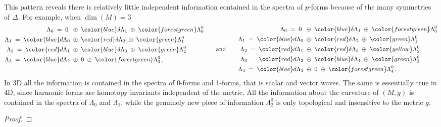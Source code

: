 \begin{mytheorem}
\noindent
This pattern reveals there is relatively little independent information contained in the spectra of $p$-forms because of the many symmetries of $\Delta$.
%
For example, when \(\dim(M)=3\) 
\begin{align}
\begin{aligned}
  \Lambda_0 \;=\; 0\;\;&\oplus\;{\color{blue}\delta\Lambda_1}\;\oplus\;{\color{forestgreen}\Lambda_0^0}\\
  \Lambda_1 \;=\; {\color{blue}d\Lambda_0}\;&\oplus\;{\color{red}\delta\Lambda_2}\;\oplus\;{\color{green}\Lambda_1^0}\\
  \Lambda_2 \;=\; {\color{red}d\Lambda_1}\;&\oplus\;{\color{blue}\delta\Lambda_3}\;\oplus\;{\color{green}\Lambda_2^0}\\
  \Lambda_3 \;=\; {\color{blue}d\Lambda_2}\;&\oplus\; 0\; \oplus\;{\color{forestgreen}\Lambda_3^0}\,,\\
  .
\end{aligned}
\qquad \text{and}\qquad
\begin{aligned}
  \Lambda_0 \;=\; 0\;\;&\oplus\;{\color{blue}\delta\Lambda_1}\;\oplus\;{\color{forestgreen}\Lambda_0^0}\\
  \Lambda_1 \;=\; {\color{blue}d\Lambda_0}\;&\oplus\;{\color{red}\delta\Lambda_2}\;\oplus\;{\color{green}\Lambda_1^0}\\
  \Lambda_2 \;=\; {\color{red}d\Lambda_1}\;&\oplus\;{\color{red}\delta\Lambda_3}\;\oplus\;{\color{yellow}\Lambda_2^0}\\
  \Lambda_3 \;=\; {\color{red}d\Lambda_2}\;&\oplus\;{\color{blue}\delta\Lambda_4}\;\oplus\;{\color{green}\Lambda_3^0}\\
  \Lambda_4 \;=\; {\color{blue}d\Lambda_3}\;&\oplus\; 0\; \oplus\;{\color{forestgreen}\Lambda_4^0}\,.
\end{aligned}
\end{align}
%
In 3D all the information is contained in the spectra of 0-forms and 1-forms, that is scalar and vector waves.
The same is essentially true in 4D, since harmonic forms are homotopy invariants independent of the metric.
All the information about the curvature of $(M,g)$ is contained in the spectra of $\Lambda_0$ and $\Lambda_1$, while the genuinely new piece of information $\Lambda_2^0$ is only topological and insensitive to the metric $g$.
%
\end{mytheorem}
\begin{proof}
\end{proof}


